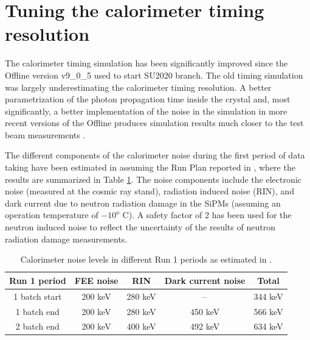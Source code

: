
\section{Tuning the calorimeter timing resolution}

The calorimeter timing simulation has been significantly improved since the Offline version
v9\_0\_5 used to start SU2020 branch.
The old timing simulation was largely underestimating the calorimeter timing resolution.
A better parametrization of the photon propagation time inside the crystal and, most significantly, a better implementation of the noise in the simulation in more recent versions of the Offline produces  simulation results much closer to the test beam measurements \cite{MU2E_35540_CALO_TIMING}.

The different components of the calorimeter noise during the first period of data taking have been estimated in \cite{MU2E_35519_CALO_NOISE} 
assuming the Run Plan reported in \cite{MU2E_33731_RUN1_PLAN}, where the results are summarized
in Table \ref{table:calonoise}. 
The noise components include the electronic noise (measured at the cosmic ray stand), 
radiation induced noise (RIN), and dark current due to neutron radiation damage
in the SiPMs (assuming an operation temperature of $-10^o$ C).
A safety factor of 2 has been used for the  neutron induced noise to reflect the uncertainty of the results of neutron radiation damage measurements.

\begin{table}[htbp]
  \begin{center} 
    \begin{tabular}{|c|c|c|c|c|}
      \hline
      Run 1 period      & FEE noise  & RIN     & Dark current noise & Total    \\ 
      \hline
      1 batch start     & 200 keV    & 280 keV &  --                & 344 keV  \\
      1 batch end       & 200 keV    & 280 keV &  450 keV           & 566 keV  \\
      2 batch end       & 200 keV    & 400 keV &  492 keV           & 634 keV  \\
      \hline
    \end{tabular}
  \end{center}
  \caption{
  \label{table:calonoise}
    Calorimeter noise levels in different Run 1 periods as estimated in \cite{MU2E_35519_CALO_NOISE}.
  }
\end{table}

